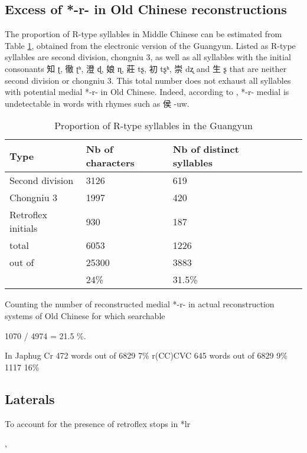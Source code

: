 \documentclass[oldfontcommands,oneside,a4paper,11pt]{article}
\newcommand{\ipa}[1]{{\phon \mbox{#1}}} %
\newcommand{\zh}[1]{{\cn #1}}
\begin{document}
\subsection{Excess of *-r- in Old Chinese reconstructions}
The proportion of R-type syllables in Middle Chinese can be estimated from Table \ref{tab:gy}, obtained from the electronic version of the Guangyun. Listed as R-type syllables are second division, chongniu 3, as well as all syllables with the initial consonants \zh{知} \ipa{ʈ}, \zh{徹} \ipa{ʈʰ},  \zh{澄} \ipa{ɖ},  \zh{娘} \ipa{ɳ},  \zh{莊} \ipa{tʂ},  \zh{初} \ipa{tʂʰ},  \zh{崇} \ipa{dʐ} and \zh{生} \ipa{ʂ} that are neither second division or chongniu 3. This total number does not exhaust all syllables with potential medial *\ipa{-r-} in Old Chinese. Indeed, according to  \citet[501]{baxter92}, *\ipa{-r-} medial is undetectable in words with rhymes such as \zh{侯} \ipa{-uw}. 

\begin{table}
\caption{Proportion of R-type syllables in the Guangyun} \label{tab:gy} \centering
\begin{tabular}{lllll}
\toprule
Type& Nb of characters & Nb of distinct syllables \\
\midrule
Second division	& 3126	 & 619 \\
Chongniu 3	& 1997	& 420 \\
Retroflex initials & 930	& 187 \\
\midrule
total&	6053	&1226\\
out of &	25300	&3883 \\
	&24\%	&31.5\% \\
	\bottomrule
\end{tabular}
\end{table}


Counting the number of reconstructed medial *\ipa{-r-} in actual reconstruction systems of Old Chinese for which searchable 

1070 / 4974 = 21.5 \%.

In Japhug
Cr 472 words out of 6829 7\%
r(CC)CVC 645 words out of 6829 9\%
1117 16\%
\subsection{Laterals}
To account for the presence of retroflex stops in 
*lr

\citet[217-225]{starostin89}, \citet[36-40]{sagart99roc}
\end{document}
